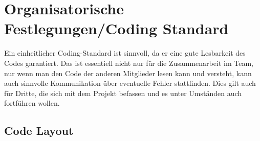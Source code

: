 \section{Organisatorische Festlegungen/Coding Standard}
Ein einheitlicher Coding-Standard ist sinnvoll, da er eine gute Lesbarkeit des Codes garantiert. Das ist essentiell nicht nur für die Zusammenarbeit im Team, nur wenn man den Code der anderen Mitglieder lesen kann und versteht, kann auch sinnvolle Kommunikation über eventuelle Fehler stattfinden. Dies gilt auch für Dritte, die sich mit dem Projekt befassen und es unter Umständen auch fortführen wollen.

\subsection{Code Layout}

